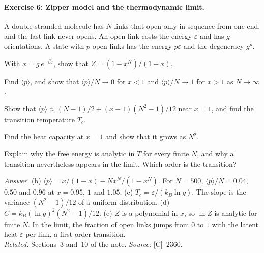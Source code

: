 \documentclass[11pt]{article}      %
\numberwithin{equation}{section}   %
\begin{document}
\paragraph{Exercise 6: Zipper model and the thermodynamic limit.}
A double-stranded molecule has $N$ links that open only in sequence from one end, and the last link never opens. An open link costs the energy $\varepsilon$ and has $g$ orientations. A state with $p$ open links has the energy $p\varepsilon$ and the degeneracy $g^p$.
\begin{parts}
    \item With $x = g\,e^{-\beta\varepsilon}$, show that $Z = (1 - x^N)/(1 - x)$.
    \item Find $\langle p\rangle$, and show that $\langle p\rangle/N \to 0$ for $x < 1$ and $\langle p\rangle/N \to 1$ for $x > 1$ as $N \to \infty$.
    \item Show that $\langle p\rangle \approx (N - 1)/2 + (x - 1)(N^2 - 1)/12$ near $x = 1$, and find the transition temperature $T_c$.
    \item Find the heat capacity at $x = 1$ and show that it grows as $N^2$.
    \item Explain why the free energy is analytic in $T$ for every finite $N$, and why a transition nevertheless appears in the limit. Which order is the transition?
\end{parts}
\textit{Answer.} (b) $\langle p\rangle = x/(1 - x) - Nx^N/(1 - x^N)$. For $N = 500$, $\langle p\rangle/N = 0.04$, $0.50$ and $0.96$ at $x = 0.95$, $1$ and $1.05$. (c) $T_c = \varepsilon/(k_B\ln g)$. The slope is the variance $(N^2 - 1)/12$ of a uniform distribution. (d) $C = k_B(\ln g)^2(N^2 - 1)/12$. (e) $Z$ is a polynomial in $x$, so $\ln Z$ is analytic for finite $N$. In the limit, the fraction of open links jumps from $0$ to $1$ with the latent heat $\varepsilon$ per link, a first-order transition.\\
\textit{Related:} Sections~3 and~10 of the note. \textit{Source:} [C]~2360.
\end{document}
